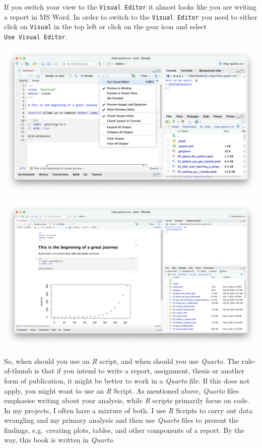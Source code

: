 \documentclass[
  letterpaper,
  DIV=11,
  numbers=noendperiod]{scrreprt}
\begin{document}
If you switch your view to the \texttt{Visual\ Editor} it almost looks
like you are writing a report in MS Word. In order to switch to the
\texttt{Visual\ Editor} you need to either click on \texttt{Visual} in
the top left or click on the gear icon and select
\texttt{Use\ Visual\ Editor}.

\includegraphics{images/chapter_06_img/03_r_markdown/02_quarto_visual_editor_menu.png}

\includegraphics{images/chapter_06_img/03_r_markdown/03_quarto_visual_editor.png}

So, when should you use an \emph{R} script, and when should you use
\emph{Quarto}. The rule-of-thumb is that if you intend to write a
report, assignment, thesis or another form of publication, it might be
better to work in a \emph{Quarto} file. If this does not apply, you
might want to use an \emph{R} Script. As mentioned above, \emph{Quarto}
files emphasise writing about your analysis, while \emph{R} scripts
primarily focus on code. In my projects, I often have a mixture of both.
I use \emph{R} Scripts to carry out data wrangling and my primary
analysis and then use \emph{Quarto} files to present the findings,
e.g.~creating plots, tables, and other components of a report. By the
way, this book is written in \emph{Quarto}.
\end{document}
